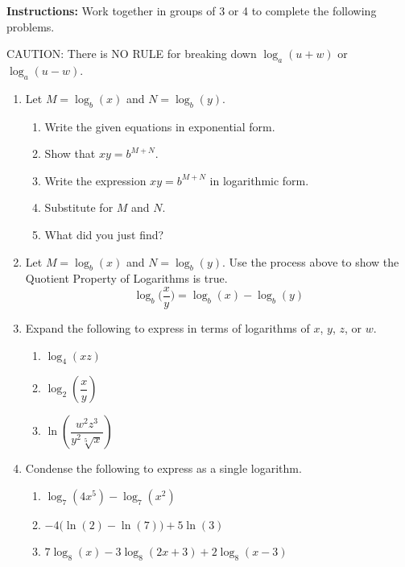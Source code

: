 



\noindent \textbf{Instructions:}  Work together in groups of  3 or 4 to complete the following problems.

\noindent CAUTION: There is NO RULE for breaking down $\log_a(u+w)$ or $\log_a(u-w)$.  


\begin{enumerate}

\item Let $M=\log_b(x)$ and $N=\log_b(y)$.
\begin{enumerate}
\item Write the given equations in exponential form.\vfill
\item Show that $xy=b^{M+N}$.\vfill
\item Write the expression $xy=b^{M+N}$ in logarithmic form.\vfill
\item Substitute for $M$ and $N$.\vfill
\item What did you just find?
\vfill
\end{enumerate}

\item Let $M=\log_b(x)$ and $N=\log_b(y)$.  Use the process above to show the Quotient Property of Logarithms is true.
$$\log_b\Big(\frac{x}{y}\Big)=\log_b(x)-\log_b(y)$$
\vfill
\vfill
\vfill


\newpage

\item Expand the following to express in terms of logarithms of $x$, $y$, $z$, or $w$.
\begin{enumerate}
\item $\log_4(xz)$ \\[.2in]
\item $\log_2\left( \dfrac{x}{y} \right)$ \\[.2in]
\item $\ln\left( \dfrac{w^2z^3}{y^2\sqrt[5]{x}} \right)$ \\[1in]
\end{enumerate}



\item Condense the following to express as a single logarithm.
\begin{enumerate}
\item $\log_7(4x^5)-\log_7(x^2)$ \\[.5in]
\item $-4\Bigg (\ln(2)-\ln(7)\Bigg )+5\ln(3)$ \\[.7in]
\item $7 \log_8 (x) - 3 \log_8(2x+3) + 2\log_8(x-3)$ \\[1in]


\end{enumerate}
\end{enumerate}
